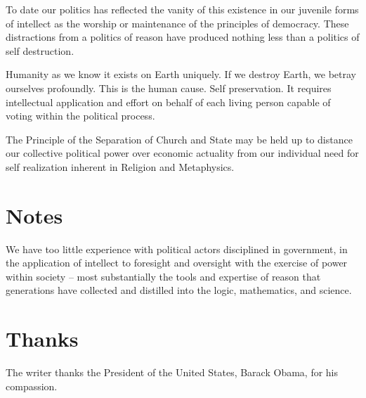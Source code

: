 \documentclass{article}
\begin{document}
To date our politics has reflected the vanity of this existence in our
juvenile forms of intellect as the worship or maintenance of the
principles of democracy.  These distractions from a politics of reason
have produced nothing less than a politics of self destruction.

Humanity as we know it exists on Earth uniquely.  If we destroy Earth,
we betray ourselves profoundly.  This is the human cause.  Self
preservation.  It requires intellectual application and effort on
behalf of each living person capable of voting within the political
process.  

The Principle of the Separation of Church and State may be held up to
distance our collective political power over economic actuality from
our individual need for self realization inherent in Religion and
Metaphysics.

\section{Notes}

We have too little experience with political actors disciplined in
government, in the application of intellect to foresight and oversight
with the exercise of power within society -- most substantially the
tools and expertise of reason that generations have collected and
distilled into the logic, mathematics, and science.

\section{Thanks}

The writer thanks the President of the United States, Barack Obama,
for his compassion.
\end{document}

